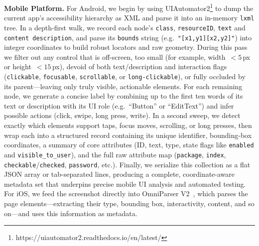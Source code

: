 \textbf{Mobile Platform.} For Android, we begin by using UIAutomator2\footnote{https://uiautomator2.readthedocs.io/en/latest/} to dump the current app’s accessibility hierarchy as XML and parse it into an in-memory \texttt{lxml} tree. In a depth-first walk, we record each node’s \texttt{class}, \texttt{resource\-ID}, \texttt{text} and \texttt{content description}, and parse its \texttt{bounds} string (e.g.\ \texttt{"[x1,y1][x2,y2]"}) into integer coordinates to build robust locators and raw geometry. During this pass we filter out any control that is off-screen, too small (for example, width~$<5$\,px or height~$<15$\,px), devoid of both text/description and interaction flags (\texttt{clickable}, \texttt{focusable}, \texttt{scrollable}, or \texttt{long-clickable}), or fully occluded by its parent—leaving only truly visible, actionable elements. For each remaining node, we generate a concise label by combining up to the first ten words of its text or description with its UI role (e.g.\ “Button” or “EditText”) and infer possible actions (click, swipe, long press, write). In a second sweep, we detect exactly which elements support taps, focus moves, scrolling, or long presses, then wrap each into a structured record containing its unique identifier, bounding‐box coordinates, a summary of core attributes (ID, text, type, state flags like \texttt{enabled} and \texttt{visible\_to\_user}), and the full raw attribute map (\texttt{package}, \texttt{index}, \texttt{checkable}/\texttt{checked}, \texttt{password}, etc.). Finally, we serialize this collection as a flat JSON array or tab-separated lines, producing a complete, coordinate-aware metadata set that underpins precise mobile UI analysis and automated testing. 
For iOS, we feed the screenshot directly into OmniParser V2~\citep{yu2025omniparser}, which parses the page elements—extracting their type, bounding box, interactivity, content, and so on—and uses this information as metadata.


